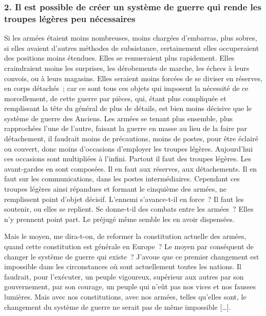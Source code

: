 \documentclass[french,twoside]{book} %
\begin{document}
\subsubsection[{2. Il est possible de créer un système de guerre qui rende les troupes légères peu nécessaires}]{2. Il est possible de créer un système de guerre qui rende les troupes légères peu nécessaires}
\noindent Si les armées étaient moins nombreuses, moins chargées d’embarras, plus sobres, si elles avaient d’autres méthodes de subsistance, certainement elles occuperaient des positions moins étendues. Elles se remueraient plus rapidement. Elles craindraient moins les surprises, les dérobements de marche, les échecs à leurs convois, ou à leurs magasins. Elles seraient moins forcées de se diviser en réserves, en corps détachés ; car ce sont tous ces objets qui imposent la nécessité de ce morcellement, de cette guerre par pièces, qui, étant plus compliquée et remplissant la tête du général de plus de détails, est bien moins décisive que le système de guerre des Anciens. Les armées se tenant plus ensemble, plus rapprochées l’une de l’autre, faisant la guerre en masse au lieu de la faire par détachement, il faudrait moins de précautions, moins de postes, pour être éclairé ou couvert, donc moins d’occasions d’employer les troupes légères. Aujourd’hui ces occasions sont multipliées à l’infini. Partout il faut des troupes légères. Les avant-gardes en sont composées. Il en faut aux réserves, aux détachements. Il en faut sur les communications, dans les postes intermédiaires. Cependant ces troupes légères ainsi répandues et formant le cinquième des armées, ne remplissent point d’objet décisif. L’ennemi s’avance-t-il en force ? Il faut les soutenir, ou elles se replient. Se donne-t-il des combats entre les armées ? Elles n’y prennent point part. Le préjugé même semble les en avoir dispensées.\par
Mais le moyen, me dira-t-on, de reformer la constitution actuelle des armées, quand cette constitution est générale en Europe ? Le moyen par conséquent de changer le système de guerre qui existe ? J’avoue que ce premier changement est impossible dans les circonstances où sont actuellement toutes les nations. Il faudrait, pour l’exécuter, un peuple vigoureux, supérieur aux autres par son gouvernement, par son courage, un peuple qui n’eût pas nos vices et nos fausses lumières. Mais avec nos constitutions, avec nos armées, telles qu’elles sont, le changement du système de guerre ne serait pas de même impossible […].
\end{document}
